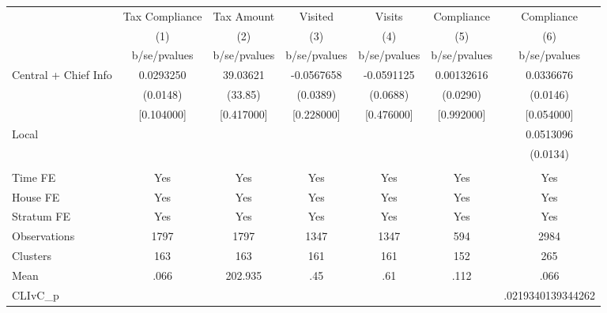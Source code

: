 {
\def\sym#1{\ifmmode^{#1}\else\(^{#1}\)\fi}
\begin{tabular}{l*{6}{c}}
\toprule
                &\multicolumn{1}{c}{Tax Compliance}&\multicolumn{1}{c}{Tax Amount}&\multicolumn{1}{c}{Visited}&\multicolumn{1}{c}{Visits}&\multicolumn{1}{c}{Compliance}&\multicolumn{1}{c}{Compliance}\\
                &\multicolumn{1}{c}{(1)}&\multicolumn{1}{c}{(2)}&\multicolumn{1}{c}{(3)}&\multicolumn{1}{c}{(4)}&\multicolumn{1}{c}{(5)}&\multicolumn{1}{c}{(6)}\\
                &b/se/pvalues&b/se/pvalues&b/se/pvalues&b/se/pvalues&b/se/pvalues&b/se/pvalues\\
\midrule
Central + Chief Info&0.0293250& 39.03621&-0.0567658&-0.0591125&0.00132616&0.0336676\\
                & (0.0148)&  (33.85)& (0.0389)& (0.0688)& (0.0290)& (0.0146)\\
                &[0.104000]&[0.417000]&[0.228000]&[0.476000]&[0.992000]&[0.054000]\\
Local           &         &         &         &         &         &0.0513096\\
                &         &         &         &         &         & (0.0134)\\
                &         &         &         &         &         &         \\
Time FE         &      Yes&      Yes&      Yes&      Yes&      Yes&      Yes\\
House FE        &      Yes&      Yes&      Yes&      Yes&      Yes&      Yes\\
Stratum FE      &      Yes&      Yes&      Yes&      Yes&      Yes&      Yes\\
\midrule
Observations    &     1797&     1797&     1347&     1347&      594&     2984\\
Clusters        &      163&      163&      161&      161&      152&      265\\
Mean            &     .066&  202.935&      .45&      .61&     .112&     .066\\
CLIvC\_p         &         &         &         &         &         &.0219340139344262\\
\bottomrule
\end{tabular}
}
